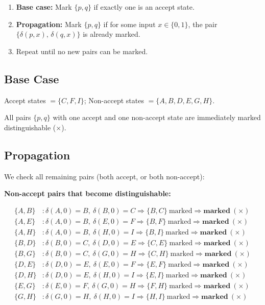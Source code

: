 \documentclass{article}
\theoremstyle{theorem}
\theoremstyle{definition}
\theoremstyle{remark}
\begin{document}
\begin{enumerate}
    \item \textbf{Base case:} Mark $\{p,q\}$ if exactly one is an accept state.
    \item \textbf{Propagation:} Mark $\{p,q\}$ if for some input $x \in \{0,1\}$, the pair $\{\delta(p,x),\,\delta(q,x)\}$ is already marked.
    \item Repeat until no new pairs can be marked.
\end{enumerate}

\subsection*{Base Case}

Accept states $= \{C, F, I\}$; \quad Non-accept states $= \{A, B, D, E, G, H\}$.

All pairs $\{p, q\}$ with one accept and one non-accept state are immediately marked distinguishable ($\times$).

\subsection*{Propagation}

We check all remaining pairs (both accept, or both non-accept):

\medskip
\noindent\textbf{Non-accept pairs that become distinguishable:}

\begin{align*}
\{A,B\} &: \delta(A,0)=B,\ \delta(B,0)=C \Rightarrow \{B,C\}\ \text{marked} \Rightarrow \textbf{marked}\ (\times) \\
\{A,E\} &: \delta(A,0)=B,\ \delta(E,0)=F \Rightarrow \{B,F\}\ \text{marked} \Rightarrow \textbf{marked}\ (\times) \\
\{A,H\} &: \delta(A,0)=B,\ \delta(H,0)=I \Rightarrow \{B,I\}\ \text{marked} \Rightarrow \textbf{marked}\ (\times) \\
\{B,D\} &: \delta(B,0)=C,\ \delta(D,0)=E \Rightarrow \{C,E\}\ \text{marked} \Rightarrow \textbf{marked}\ (\times) \\
\{B,G\} &: \delta(B,0)=C,\ \delta(G,0)=H \Rightarrow \{C,H\}\ \text{marked} \Rightarrow \textbf{marked}\ (\times) \\
\{D,E\} &: \delta(D,0)=E,\ \delta(E,0)=F \Rightarrow \{E,F\}\ \text{marked} \Rightarrow \textbf{marked}\ (\times) \\
\{D,H\} &: \delta(D,0)=E,\ \delta(H,0)=I \Rightarrow \{E,I\}\ \text{marked} \Rightarrow \textbf{marked}\ (\times) \\
\{E,G\} &: \delta(E,0)=F,\ \delta(G,0)=H \Rightarrow \{F,H\}\ \text{marked} \Rightarrow \textbf{marked}\ (\times) \\
\{G,H\} &: \delta(G,0)=H,\ \delta(H,0)=I \Rightarrow \{H,I\}\ \text{marked} \Rightarrow \textbf{marked}\ (\times)
\end{align*}
\end{document}

